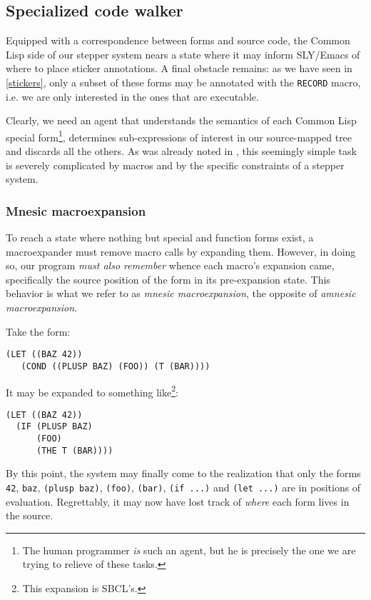 \documentclass[format=sigconf]{acmart}
\begin{document}
\subsection{Specialized code walker}

Equipped with a correspondence between forms and source code, the
Common Lisp side of our stepper system nears a state where it may
inform SLY/Emacs of where to place sticker annotations.  A final
obstacle remains: as we have seen in \ref{stickers}, only a subset of
these forms may be annotated with the \texttt{RECORD} macro, i.e. we
are only interested in the ones that are executable.

Clearly, we need an agent that understands the semantics of each
Common Lisp special form\footnote{The human programmer \emph{is} such
  an agent, but he is precisely the one we are trying to relieve of
  these tasks.}, determines sub-expressions of interest in our
source-mapped tree and discards all the others.  As was already noted
in \cite{annotation-based}, this seemingly simple task is severely
complicated by macros and by the specific constraints of a stepper
system.

\subsubsection{Mnesic macroexpansion}

To reach a state where nothing but special and function forms exist, a
macroexpander must remove macro calls by expanding them.  However, in
doing so, our program \emph{must also remember} whence each macro's
expansion came, specifically the source position of the form in its
pre-expansion state.  This behavior is what we refer to as
\emph{mnesic macroexpansion}, the opposite of \emph{amnesic
  macroexpansion}.

Take the form:

\begin{verbatim}
(LET ((BAZ 42))
   (COND ((PLUSP BAZ) (FOO)) (T (BAR))))
\end{verbatim}

It may be expanded to something like\footnote{This expansion is
  SBCL's.}:

\begin{verbatim}
(LET ((BAZ 42))
  (IF (PLUSP BAZ)
      (FOO)
      (THE T (BAR))))
\end{verbatim}

By this point, the system may finally come to the realization that
only the forms \texttt{42}, \texttt{baz}, \texttt{(plusp baz)},
\texttt{(foo)}, \texttt{(bar)}, \texttt{(if ...)} and \texttt{(let
  ...)} are in positions of evaluation.  Regrettably, it may now have
lost track of \emph{where} each form lives in the source.
\end{document}
